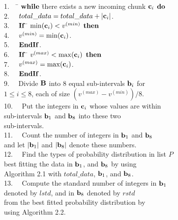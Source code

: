 \documentclass[lettersize,journal]{IEEEtran}
\begin{document}
\begin{tabbing}
1.~~ \= ${\bf while}$ \= there exists a new incoming chunk ${\bf c}_{i}$ ${\bf do}$ \\
2.~~ \>               \> $total\_data = total\_data + |{\bf c}_{i}|$. \\
3.~~ \>               \> ${\bf If}$ \= $\min({\bf c}_{i}) < v^{(min)}$ ${\bf then}$ \\
4.~~ \>               \>          \> $v^{(min)} = \min({\bf c}_{i})$. \\
5.~~ \>               \> ${\bf EndIf}$. \\
6.~~ \>               \> ${\bf If}$ \= $v^{(max)} < \max({\bf c}_{i})$ ${\bf then}$ \\
7.~~ \>               \>          \> $v^{(max)} = \max({\bf c}_{i})$. \\
8.~~ \>               \> ${\bf EndIf}$. \\
9.~~ \>               \> Divide ${\bf B}$ into 8 equal sub-intervals ${\bf b}_{i}$ for \\
     \>               \> $1 \leq i \leq 8$, each of size $(v^{(max)} - v^{(min)})/8$. \\
10.~~\>               \> Put the integers in ${\bf c}_{i}$ whose values are within \\
     \>               \> sub-intervals ${\bf b}_{1}$ and ${\bf b}_{8}$ into these two \\
     \>               \> sub-intervals. \\
11.~~\>               \> Count the number of integers in ${\bf b}_{1}$ and ${\bf b}_{8}$  \\
     \>               \> and let $|{\bf b}_{1}|$ and $|{\bf b}_{8}|$ denote these numbers. \\
12.~~\>               \> Find the types of probability distribution in list $P$ \\
     \>               \> best fitting the data in ${\bf b}_{1}$, and ${\bf b}_{8}$ by using \\
     \>               \> Algorithm 2.1 with $total\_data$, ${\bf b}_{1}$, and ${\bf b}_{8}$. \\
13.~~\>               \> Compute the standard number of integers in ${\bf b}_{1}$ \\
     \>               \> denoted by $lstd$, and in ${\bf b}_{8}$ denoted by $rstd$ \\
     \>               \> from the best fitted probability distribution by \\
     \>               \> using Algorithm 2.2. \\

\end{tabbing}
\end{document}
